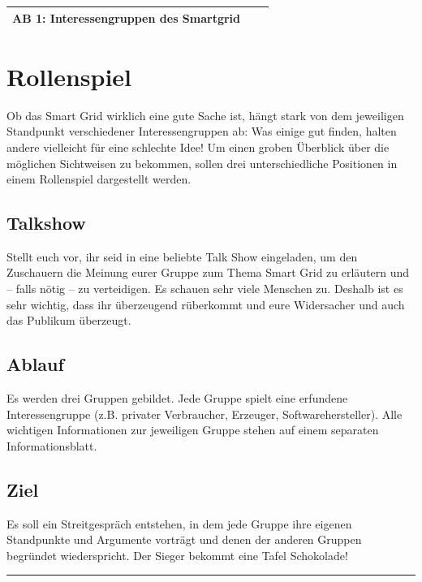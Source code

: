 \documentclass[11pt,a4paper,DIV=10,parskip=half,BCOR=0mm]{scrartcl}
\begin{document}
%
\setlength{\tabcolsep}{0mm} %
\begin{tabularx}{\linewidth}{lXr}
{\LARGE\textbf{\textsf{AB 1: Interessengruppen des Smartgrid}}} & &%
\\
\hline
\end{tabularx}
%
\section*{Rollenspiel}
Ob das Smart Grid wirklich eine gute Sache ist, hängt stark von dem jeweiligen Standpunkt
verschiedener Interessengruppen ab: Was einige gut finden, halten andere vielleicht für eine
schlechte Idee! Um einen groben Überblick über die möglichen Sichtweisen zu bekommen,
sollen drei unterschiedliche Positionen in einem Rollenspiel dargestellt werden.
\subsection*{Talkshow}
Stellt euch vor, ihr seid in eine beliebte Talk Show eingeladen, um den Zu\-schau\-ern
die Meinung eurer Gruppe zum Thema Smart Grid zu erläutern und -- falls nötig -- zu verteidigen. Es schauen sehr viele Menschen zu. Deshalb ist es sehr wichtig, dass ihr überzeugend rüberkommt und eure Widersacher und auch das Publikum überzeugt.
\subsection*{Ablauf}
Es werden drei Gruppen gebildet. Jede Gruppe spielt eine erfundene Interessengruppe (z.B. privater Verbraucher, Erzeuger, Softwarehersteller). Alle wichtigen Informationen zur jeweiligen Gruppe stehen auf einem separaten Informationsblatt.
\subsection*{Ziel}
Es soll ein Streitgespräch entstehen, in dem jede Gruppe ihre eigenen
Standpunkte und Argumente vorträgt und denen der anderen Gruppen
begründet wiederspricht. Der Sieger bekommt eine Tafel Schokolade! \\
\hrule
\end{document}

